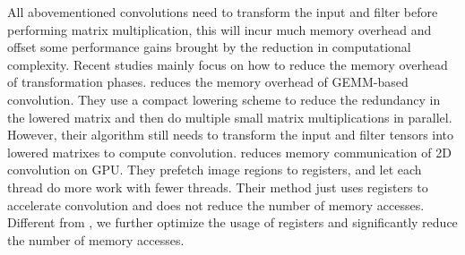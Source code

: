 All abovementioned convolutions need to transform the input and filter before performing matrix multiplication, this will incur much memory
overhead and offset some performance gains brought by the reduction in computational complexity. Recent studies mainly focus on how to
reduce the memory overhead of transformation phases. \cite{cho2017mec} reduces the memory overhead of GEMM-based convolution. They use a
compact lowering scheme to reduce the redundancy in the lowered matrix and then do multiple small matrix multiplications in parallel.
However, their algorithm still needs to transform the input and filter tensors into lowered matrixes to compute convolution.
\cite{Iandola2014Communication} reduces memory  communication of 2D convolution on GPU. They prefetch image regions to registers, and let
each  thread do more work with fewer threads. Their method just uses registers to accelerate convolution and does not reduce the number of
memory accesses. Different from \cite{Iandola2014Communication}, we further optimize the usage of registers and significantly reduce the
number of memory accesses.
